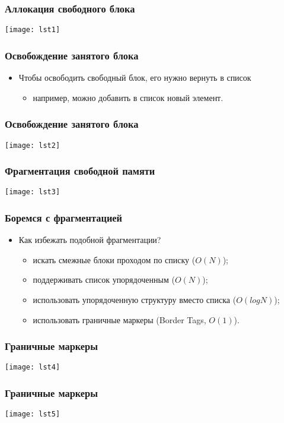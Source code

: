 \begin{frame}
\frametitle{Аллокация свободного блока}
\texttt{[image: lst1]}
\end{frame}

\begin{frame}
\frametitle{Освобождение занятого блока}
\begin{itemize}
    \item<1->Чтобы освободить свободный блок, его нужно вернуть в список
    \begin{itemize}
        \item<2->например, можно добавить в список новый элемент.
    \end{itemize}
\end{itemize}
\end{frame}

\begin{frame}
\frametitle{Освобождение занятого блока}
\texttt{[image: lst2]}
\end{frame}

\begin{frame}
\frametitle{Фрагментация свободной памяти}
\texttt{[image: lst3]}
\end{frame}

\begin{frame}
\frametitle{Боремся с фрагментацией}
\begin{itemize}
    \item<1->Как избежать подобной фрагментации?
    \begin{itemize}
        \item<2->искать смежные блоки проходом по списку ($O\left(N\right)$);
        \item<3->поддерживать список упорядоченным ($O\left(N\right)$);
        \item<4->использовать упорядоченную структуру вместо списка
        ($O\left(log N\right)$);
        \item<5->использовать граничные маркеры (Border Tags,
        $O\left(1\right)$).
    \end{itemize}
\end{itemize}
\end{frame}

\begin{frame}
\frametitle{Граничные маркеры}
\texttt{[image: lst4]}
\end{frame}

\begin{frame}
\frametitle{Граничные маркеры}
\texttt{[image: lst5]}
\end{frame}

